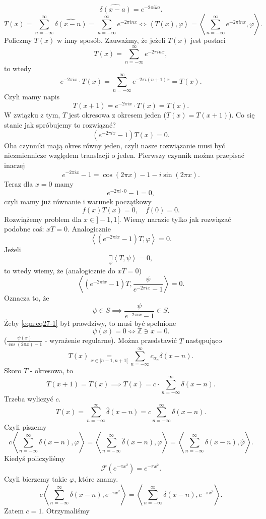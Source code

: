 \documentclass[../main.tex]{subfiles}
\begin{document}
    \[
        \widehat{\delta(x-a)} = e^{-2\pi i k a}
    .\]
\[
    T(x) = \sum_{n=-\infty}^{\infty} \widehat{\delta(x-n)} = \sum_{n=-\infty}^{\infty} e^{-2 \pi i n x} \iff \left<T(x), \varphi \right> = \left<\sum_{n=-\infty}^{\infty} e^{-2\pi i n x}, \varphi \right>
.\]
Policzmy $T(x)$ w inny sposób. Zauważmy, że jeżeli $T(x)$ jest postaci
\[
    T(x) = \sum_{n=-\infty}^{\infty} e^{-2\pi i n x}
,\]
to wtedy
\[
    e^{-2\pi i x}\cdot T(x) = \sum_{n=-\infty}^{\infty} e^{-2\pi i (n+1) x} = T(x)
.\]
Czyli mamy napis
\[
    T(x+1) = e^{-2\pi i x}\cdot T(x) = T(x)
.\]
W związku z tym, $T$ jest okresowa z okresem jeden ($T(x) = T(x+1)$). Co się stanie jak spróbujemy to rozwiązać?
 \[
     \left( e^{-2\pi i x} - 1 \right) T(x) = 0
.\]
Oba czynniki mają okres równy jeden, czyli nasze rozwiązanie musi być niezmiennicze względem translacji o jeden. Pierwszy czynnik można przepisać inaczej
\[
    e^{-2\pi i x} - 1 = \cos(2\pi x) - 1 - i \sin(2 \pi x)
.\]
Teraz dla $x = 0$ mamy
\[
    e^{-2\pi i \cdot 0} - 1 = 0
,\]
czyli mamy już równanie i warunek początkowy
\[
    f(x)T(x) = 0,\quad f(0) = 0
.\]
Rozwiążemy problem dla $x \in ]-1,1[$. Wiemy narazie tylko jak rozwiązać podobne coś:  $xT = 0$. Analogicznie
 \[
     \left<\left(e^{-2\pi i x} - 1\right)T, \varphi \right> = 0
.\]
Jeżeli
\[
    \underset{\psi}{\exists} \left<T, \psi \right> = 0
,\]
to wtedy wiemy, że (analogicznie do $xT =0$)
\[
    \left<\left( e^{-2\pi i x} - 1 \right) T, \frac{\psi}{e^{-2\pi i x} - 1} \right> = 0
.\]
Oznacza to, że
\begin{equation}
    \label{eqn:eq27-1}
    \psi\in S \implies \frac{\psi}{e^{-2\pi i x} - 1}\in S
.\end{equation}
Żeby \eqref{eqn:eq27-1} był prawdziwy, to musi być spełnione
\[
    \psi(x) = 0 \iff \mathbb{Z} \ni x = 0
.\]
($\frac{\psi(x)}{\cos(2\pi x) - 1}$ - wyrażenie regularne).
Można przedstawić $T$ następująco
\[
    T(x) \underset{x\in ]n-1,n+1[}{=}  \sum_{n=-\infty}^{\infty} c_{\alpha_n}\delta(x-n)
.\]
Skoro $T$ - okresowa, to
\[
    T(x+1) = T(x) \implies T(x) = c \cdot \sum_{n=-\infty}^{\infty} \delta(x-n)
.\]
Trzeba wyliczyć $c$.
\[
    T(x) = \sum_{n=-\infty}^{\infty} \hat{\delta}(x-n) = c \sum_{n=-\infty}^{\infty} \delta(x-n)
.\]
Czyli piszemy
\[
    c \left<\sum_{n=-\infty}^{\infty} \delta(x-n), \varphi \right> = \left<\sum_{n=-\infty}^{\infty} \hat{\delta}(x-n), \varphi \right> = \left<\sum_{n=-\infty}^{\infty} \delta(x-n), \hat{\varphi} \right>
.\]
Kiedyś policzyliśmy
\[
    \mathcal{F}\left( e^{-\pi x^2} \right) = e^{-\pi x^2}
.\]
Czyli bierzemy takie $\varphi$, które znamy.
\[
    c \left<\sum_{n=-\infty}^{\infty} \delta(x-n), e^{-\pi x^2} \right> = \left<\sum_{n=-\infty}^{\infty} \delta(x-n), e^{-\pi x^2} \right>
.\]
Zatem $c = 1$. Otrzymaliśmy
\end{document}
